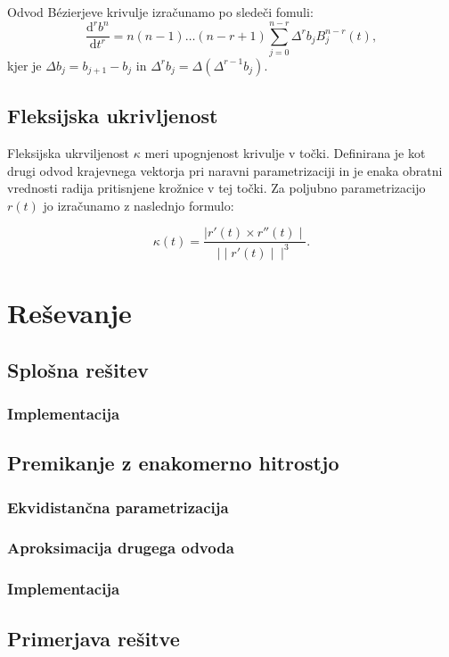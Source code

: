 \documentclass[a4paper,12pt]{article}
\begin{document}
	Odvod B\'ezierjeve krivulje izračunamo po sledeči fomuli:
	$$
	\frac{\mathrm{d}^r b^n}{\mathrm{d}t^r} = n (n-1) \ldots (n - r + 1) \sum_{j=0}^{n-r} \Delta^r b_j B_j^{n-r}(t),
	$$
	kjer je $\Delta b_j = b_{j+1} - b_j$ in $\Delta^r b_j = \Delta (\Delta^{r-1} b_j)$.
	
	\subsection{Fleksijska ukrivljenost}
	
	Fleksijska ukrviljenost $\kappa$ meri upognjenost krivulje v točki. Definirana je kot drugi odvod krajevnega vektorja pri naravni parametrizaciji in je enaka obratni vrednosti radija pritisnjene krožnice v tej točki. Za poljubno parametrizacijo $r(t)$ jo izračunamo z naslednjo formulo:
	
	$$
	\kappa(t) = \frac{\mid r'(t) \times r''(t) \mid}{\mid\mid r'(t) \mid\mid ^3}.
	$$
	
	\section{Reševanje}
	
	\subsection{Splošna rešitev}
	
	\subsubsection{Implementacija}
	
	\subsection{Premikanje z enakomerno hitrostjo}
	
	\subsubsection{Ekvidistančna parametrizacija}
	
	\subsubsection{Aproksimacija drugega odvoda}
	
	\subsubsection{Implementacija}
	
	\subsection{Primerjava rešitve}
	
\end{document}
